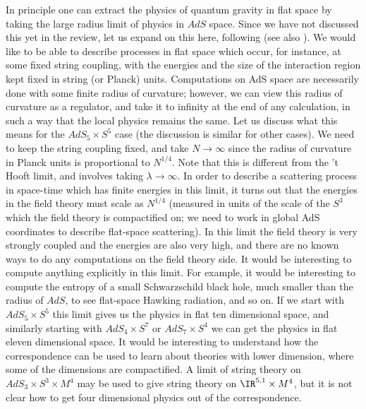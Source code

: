 In principle one can extract the physics of quantum gravity 
in flat space by taking
the large radius limit of physics in $AdS$ space. 
Since we have not discussed this yet in the review, let us expand on
this here, following
\cite{Polchinski:1999ry,Susskind:1998vk,Giddings:1999qu,Polchinski:1999yd}
(see also \cite{Balasubramanian:1999ri,Aref'eva:1999mi,Lee:1999ua,
Li:1999vi}). 
We would like to be able to describe processes in flat space which
occur, for instance, at some fixed string coupling, with the energies and
the size of the interaction region kept fixed in string (or Planck)
units. Computations on AdS space are necessarily done with some finite
radius of curvature; however, we can
view this radius of curvature as a 
regulator, and take it to infinity at the end of any calculation, 
in such a way that the local physics remains the same.
Let us discuss what this means for the $AdS_5\times S^5$ case (the
discussion is similar for other cases). We need to keep the string
coupling fixed, and take $N \to \infty$ since the radius of curvature
in Planck units is proportional to $N^{1/4}$. Note that this is
different from the 't Hooft limit, and involves taking $\lambda \to
\infty$. In order to describe a scattering process in space-time which
has finite energies in this limit, it turns out that the energies in
the field theory must scale as $N^{1/4}$ (measured in units of
the scale of the
$S^3$ which the field theory is compactified on; we need to work in
global AdS coordinates to describe flat-space scattering). In this
limit the field theory is very strongly coupled and the energies are
also very high, and there are no known ways to do any computations on
the field theory side.
It would be interesting to compute anything explicitly in this limit. 
For example, it would be interesting to compute the entropy of a small
Schwarzschild black hole, much smaller than the radius of $AdS$, to
see flat-space Hawking radiation, and so on. If we start with
$AdS_5\times S^5$ this limit gives us the physics in flat ten
dimensional space, and similarly starting with $AdS_4\times S^7$ or
$AdS_7\times S^4$ we can get the physics in flat eleven dimensional
space. It would be interesting to understand how the correspondence
can be used to learn about theories with lower dimension, where some
of the dimensions are compactified. A limit of string theory on
$AdS_3\times S^3\times M^4$ may be used to give string theory on
$\IR^{5,1}\times M^4$, but it is not clear how to get four dimensional
physics out of the correspondence. 

